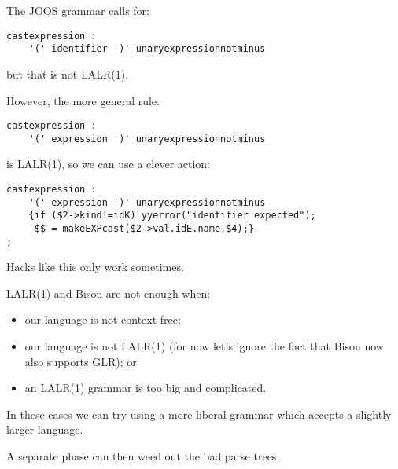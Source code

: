 \begin{slide*}
The JOOS grammar calls for:

\begin{scriptsize}
\begin{verbatim}
castexpression : 
    '(' identifier ')' unaryexpressionnotminus
\end{verbatim}
\end{scriptsize}

but that is not LALR(1). 

\vspace{0.1in}

However, the more general rule:

\begin{scriptsize}
\begin{verbatim}
castexpression : 
    '(' expression ')' unaryexpressionnotminus
\end{verbatim}
\end{scriptsize}

is LALR(1), so we can use a clever action:

\begin{scriptsize}
\begin{verbatim}
castexpression : 
    '(' expression ')' unaryexpressionnotminus
    {if ($2->kind!=idK) yyerror("identifier expected");
     $$ = makeEXPcast($2->val.idE.name,$4);}
;
\end{verbatim}
\end{scriptsize}

Hacks like this only work sometimes.
\vfil
\end{slide*}
 
\begin{slide*}
LALR(1) and Bison are not enough when:
\begin{itemize}
\item our language is not context-free;
\item our language is not LALR(1) (for now let's ignore the fact that Bison
now also supports GLR); or
\item an LALR(1) grammar is too big and complicated.
\end{itemize}
In these cases we can try using a more liberal grammar which accepts a
slightly larger language.

A separate phase can then weed out the bad parse trees.
\vfil
\end{slide*}
 
